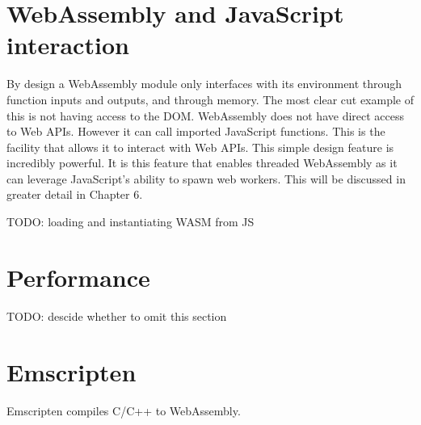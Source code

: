 \documentclass[11pt]{book}
\begin{document}
\section{WebAssembly and JavaScript interaction}


By design a WebAssembly module only interfaces with its environment through function inputs and outputs, and through memory. 
The most clear cut example of this is not having access to the DOM. 
WebAssembly does not have direct access to Web APIs. However it can call imported JavaScript functions. This is the facility that allows it to interact with Web APIs. This simple design feature is incredibly powerful. It is this feature that enables threaded WebAssembly as it can leverage JavaScript's ability to spawn web workers. This will be discussed in greater detail in Chapter 6.

TODO: loading and instantiating WASM from JS


\section{Performance}

TODO: descide whether to omit this section

\section{Emscripten}

Emscripten compiles C/C++ to WebAssembly.




\end{document}
